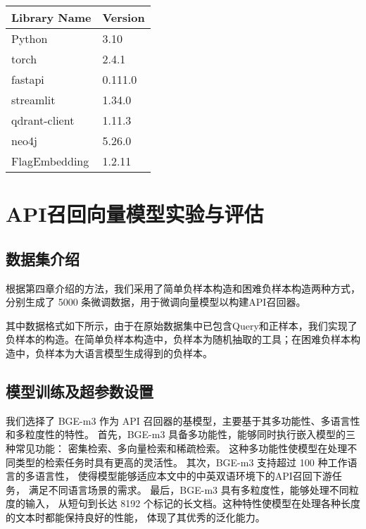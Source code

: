 \begin{table}[h]
  \centering
  \begin{tabular}{l|l}
  \toprule
  \textbf{Library Name}    & \textbf{Version} \\ \midrule
  Python                   & 3.10             \\
  torch                    & 2.4.1            \\
  fastapi                  & 0.111.0          \\
  streamlit                & 1.34.0           \\
  qdrant-client            & 1.11.3           \\
  neo4j                    & 5.26.0           \\
  FlagEmbedding            & 1.2.11           \\
  \bottomrule
  \end{tabular}
  \label{tab:library_environment}
\end{table}

\section{API召回向量模型实验与评估}

\subsection{数据集介绍}

根据第四章介绍的方法，我们采用了简单负样本构造和困难负样本构造两种方式，分别生成了 5000 条微调数据，用于微调向量模型以构建API召回器。

其中数据格式如下所示，由于在原始数据集中已包含Query和正样本，我们实现了负样本的构造。在简单负样本构造中，负样本为随机抽取的工具；在困难负样本构造中，负样本为大语言模型生成得到的负样本。

\subsection{模型训练及超参数设置}

我们选择了 BGE-m3\cite{chen2024bge} 作为 API 召回器的基模型，主要基于其多功能性、多语言性和多粒度性的特性。
首先，BGE-m3 具备多功能性，能够同时执行嵌入模型的三种常见功能：
密集检索、多向量检索和稀疏检索。
这种多功能性使模型在处理不同类型的检索任务时具有更高的灵活性。
其次，BGE-m3 支持超过 100 种工作语言的多语言性，
使得模型能够适应本文中的中英双语环境下的API召回下游任务，
满足不同语言场景的需求。
最后，BGE-m3 具有多粒度性，能够处理不同粒度的输入，
从短句到长达 8192 个标记的长文档。这种特性使模型在处理各种长度的文本时都能保持良好的性能，
体现了其优秀的泛化能力。

